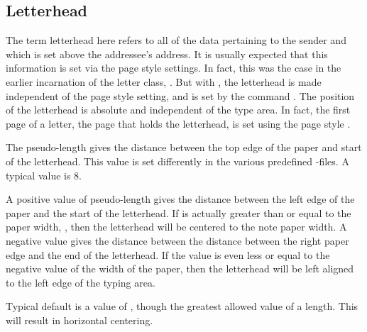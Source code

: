 \subsection{Letterhead}
\BeginIndexGroup
{}

The term letterhead here refers to all of the data pertaining to the sender
and which is set above the addressee's address. It is usually expected that
this information is set via the page style settings. In fact, this was the
case in the earlier incarnation of the letter class,
. But with , the
letterhead is made independent of the page style setting, and is set by the
command .
\iftrue%
The position of the letterhead is absolute and independent of the type
area. In fact, the first page of a letter, the page that holds the letterhead,
is set using the page style .%
\fi

\begin{Declaration}
\end{Declaration}
The pseudo-length  gives the distance between the top
edge of the paper and start of the letterhead. This value is set differently
in the various predefined
-files. A
typical value is 8.%
%
\EndIndexGroup


\begin{Declaration}
\end{Declaration}
A positive value of pseudo-length
 gives the distance
between the left edge of the paper and the start of the
letterhead. If is actually greater than or equal to the
paper width,
,
then the letterhead will be centered to the note paper width. A negative value
gives the distance between the distance between the right paper edge and the
end of the letterhead. If the value is even less or equal to the negative
value of the width of the paper, then the letterhead will be left aligned to
the left edge of the typing area.

Typical default is a value of
, though the greatest allowed value of
a length. This will result in horizontal centering.%
%
\EndIndexGroup


